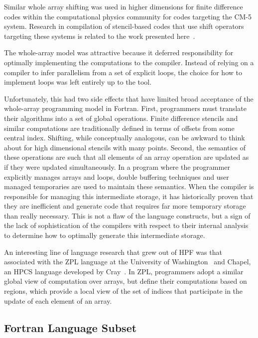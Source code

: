 \noindent
Similar whole array shifting was used in higher dimensions for finite difference
codes within the computational physics community for codes targeting the CM-5
system.  Research in compilation of stencil-based codes that use shift operators
targeting these systems is related to the work presented
here~\cite{stencil-compiler}.

The whole-array model was attractive because it deferred responsibility for
optimally implementing the computations to the compiler.  Instead of relying on
a compiler to infer parallelism from a set of explicit loops, the choice for how
to implement loops was left entirely up to the tool.

Unfortunately, this had
two side effects that have limited broad acceptance of the whole-array
programming model in Fortran.  First, programmers must translate their
algorithms into a set of global operations.  Finite difference stencils and
similar computations are traditionally defined in terms of offsets from some
central index.  Shifting, while conceptually analogous, can be awkward to think
about for high dimensional stencils with many points.  Second, the semantics of
these operations are such that all elements of an array operation are updated as
if they were updated simultaneously.  In a program where the programmer
explicitly manages arrays and loops, double buffering techniques and user
managed temporaries are used to maintain these semantics.  When the compiler is
responsible for managing this intermediate storage, it has historically proven
that they are inefficient and generate code that requires far more temporary
storage than really necessary.  This is not a flaw of the language constructs,
but a sign of the lack of sophistication of the compilers with respect to their
internal analysis to determine how to optimally generate this intermediate
storage.

An interesting line of language research that grew out of HPF was that
associated with the ZPL language at the University of
Washington~\cite{chamberlain04zpl} and Chapel, an HPCS language developed by
Cray~\cite{chamberlain_chapel}.  In ZPL, programmers adopt a similar global view
of computation over arrays, but define their computations based on regions,
which provide a local view of the set of indices that participate in the update
of each element of an array.

\subsection{Fortran Language Subset}

